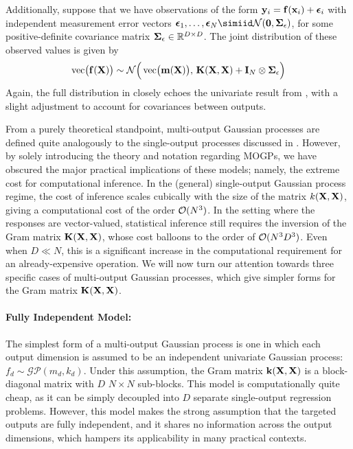 \documentclass[10pt]{article}
\newcommand{\calGP}{\mathcal{GP}}
\DeclareMathOperator{\vect}{vec}
\begin{document}
Additionally, suppose that we have observations of the form $\mathbf{y}_{i} = \mathbf{f}(\mathbf{x}_{i}) + \bm{\epsilon}_{i}$ with independent measurement error vectors $\bfepsilon_{1}, \dots, \bfepsilon_{N} \simiid \calN(\mathbf{0}, \bfSigma_{\epsilon})$, for some positive-definite covariance matrix $\bm{\Sigma}_{\epsilon} \in \mathbb{R}^{D \times D}$. The joint distribution of these observed values is given by
\begin{equation}
\label{eq:MOGP-obs-distribution}
    \vect\!\big(\bff(\bfX)\big) \sim \calN\Big(\vect\!\big(\bfm(\bfX)\big),\, \bfK(\bfX, \bfX) + \bfI_{N} \otimes \bfSigma_{\epsilon}\Big)
\end{equation}
Again, the full distribution in  closely echoes the univariate result from , with a slight adjustment to account for covariances between outputs.

From a purely theoretical standpoint, multi-output Gaussian processes are defined quite analogously to the single-output processes discussed in . However, by solely introducing the theory and notation regarding MOGPs, we have obscured the major practical implications of these models; namely, the extreme cost for computational inference. In the (general) single-output Gaussian process regime, the cost of inference scales cubically with the size of the matrix $k(\mathbf{X}, \mathbf{X})$, giving a computational cost of the order $\mathcal{O}(N^{3})$. In the setting where the responses are vector-valued, statistical inference still requires the inversion of the Gram matrix $\mathbf{K}(\mathbf{X}, \mathbf{X})$, whose cost balloons to the order of $\mathcal{O}(N^{3}D^{3})$. Even when $D \ll N$, this is a significant increase in the computational requirement for an already-expensive operation. We will now turn our attention towards three specific cases of multi-output Gaussian processes, which give simpler forms for the Gram matrix $\mathbf{K}(\mathbf{X}, \mathbf{X})$.

\paragraph{Fully Independent Model:} The simplest form of a multi-output Gaussian process is one in which each output dimension is assumed to be an independent univariate Gaussian process: $f_{d} \sim \calGP(m_{d}, k_{d})$. Under this assumption, the Gram matrix $\mathbf{k}(\mathbf{X}, \mathbf{X})$ is a block-diagonal matrix with $D$ $N \times N$ sub-blocks. This model is computationally quite cheap, as it can be simply decoupled into $D$ separate single-output regression problems. However, this model makes the strong assumption that the targeted outputs are fully independent, and it shares no information across the output dimensions, which hampers its applicability in many practical contexts.
\end{document}
